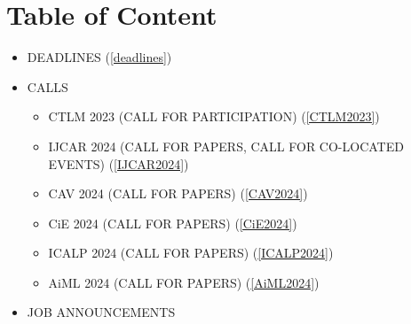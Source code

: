\documentclass[prodmode,acmtecs]{acmsmall} %
\begin{document}
\section{Table of Content}\begin{itemize}\item DEADLINES (\cref{deadlines}) 
 
\item CALLS 
 
\begin{itemize}\item CTLM 2023 (CALL FOR PARTICIPATION) (\cref{CTLM2023})
\item IJCAR 2024 (CALL FOR PAPERS, CALL FOR CO-LOCATED EVENTS) (\cref{IJCAR2024})
\item CAV 2024 (CALL FOR PAPERS) (\cref{CAV2024})
\item CiE 2024 (CALL FOR PAPERS) (\cref{CiE2024})
\item ICALP 2024 (CALL FOR PAPERS) (\cref{ICALP2024})
\item AiML 2024 (CALL FOR PAPERS) (\cref{AiML2024})
\end{itemize} 
\item JOB ANNOUNCEMENTS 
 

\end{itemize}
\end{document}

